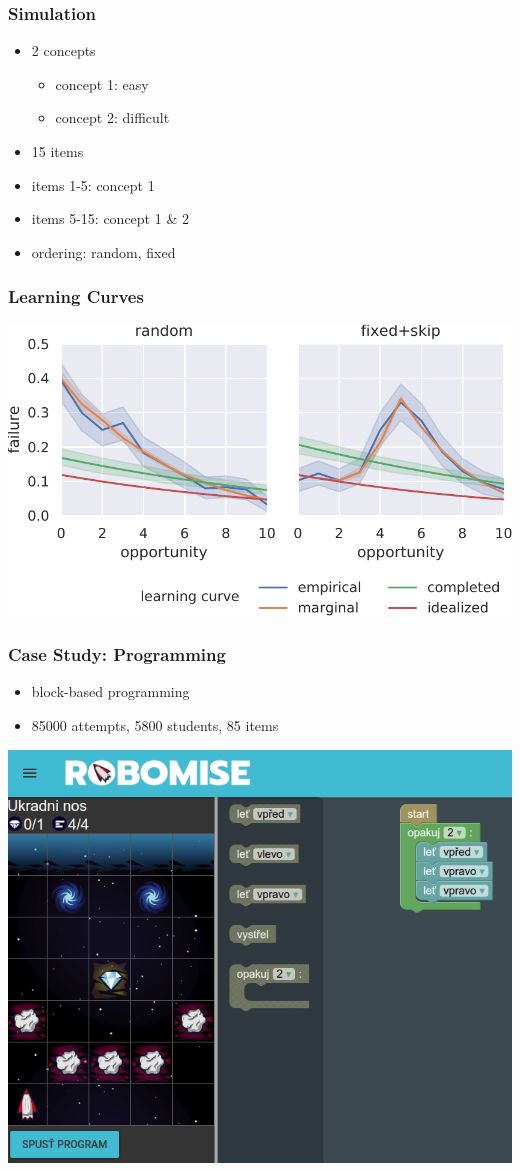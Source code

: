 \documentclass[bigger]{beamer}
\begin{document}
\begin{frame}
  \frametitle{Simulation}

  \begin{itemize}
  \item 2 concepts
    \begin{itemize}
    \item concept 1: easy
    \item concept 2: difficult
    \end{itemize}
  \item 15 items 
  \item items 1-5: concept 1
  \item items 5-15: concept 1 \& 2
  \item ordering: random, fixed 
  \end{itemize}
\end{frame}

\begin{frame}
  \frametitle{Learning Curves}

  \includegraphics[width=\linewidth]{learning-curves-simulated-true-model}

\end{frame}

\begin{frame}
  \frametitle{Case Study: Programming}

  \begin{itemize}
  \item block-based programming
  \item 85000 attempts, 5800 students, 85 items
  \end{itemize}

  \begin{center}
    \includegraphics[width=.4\linewidth]{robomise}
  \end{center}

\end{frame}
\end{document}
